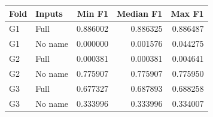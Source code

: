 \centering\footnotesize
\begin{tabular}{@{}llrrr@{}}
\toprule
Fold & Inputs & Min F1 & Median F1 & Max F1\\\midrule
G1 & Full & 0.886002 & 0.886325 & 0.886487\\
G1 & No name & 0.000000 & 0.001576 & 0.044275\\
G2 & Full & 0.000381 & 0.000381 & 0.004641\\
G2 & No name & 0.775907 & 0.775907 & 0.775950\\
G3 & Full & 0.677327 & 0.687893 & 0.688258\\
G3 & No name & 0.333996 & 0.333996 & 0.334007\\
\bottomrule
\end{tabular}

